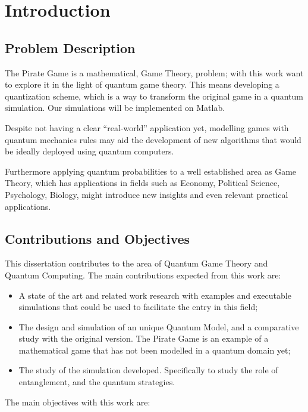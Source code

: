 \documentclass{llncs} %
\begin{document}
\section{Introduction}


\subsection{Problem Description}
\label{sec:int_problem}

The Pirate Game is a mathematical, Game Theory, problem; with this work want to explore it in the light of quantum game theory. This means developing a quantization scheme, which is a way to transform the original game in a quantum simulation. Our simulations will be implemented on Matlab.

Despite not having a clear ``real-world'' application yet, modelling games with quantum mechanics rules may aid the development of new algorithms that would be ideally deployed using quantum computers. 

Furthermore applying quantum probabilities to a well established area as Game Theory, which has applications in fields such as Economy, Political Science, Psychology, Biology, might introduce new insights and even relevant practical applications\cite{Eisert2008}. 
\subsection{Contributions and Objectives}
This dissertation contributes to the area of Quantum Game Theory and Quantum Computing. The main contributions expected from this work are:

\begin{itemize}

\item A state of the art and related work research with examples and executable simulations that could be used to facilitate the entry in this field;

\item The design and simulation of an unique Quantum Model, and a comparative study with the original version. The Pirate Game is an example of a mathematical game that has not been modelled in a quantum domain yet;

\item The study of the simulation developed. Specifically to study the role of entanglement, and the quantum strategies.
\end{itemize}
The main objectives with this work are: 
\end{document}
